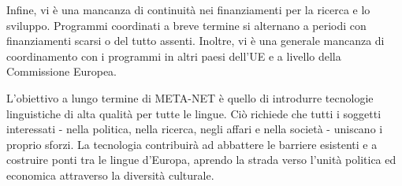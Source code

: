 \documentclass[]{../../metanetpaper}
\begin{document}
\begin{multicols}{2}
Infine, vi \`{e} una mancanza di continuit\`{a} nei finanziamenti per la
ricerca e lo sviluppo. Programmi coordinati a breve termine si alternano a
periodi con finanziamenti scarsi o del tutto assenti. Inoltre, vi \`{e} una
generale mancanza di coordinamento con i programmi in altri paesi dell'UE e a
livello della Commissione Europea.

L'obiettivo a lungo termine di META-NET \`{e} quello di introdurre tecnologie
linguistiche di alta qualit\`{a} per tutte le lingue. Ci\`{o} richiede
che tutti i soggetti interessati - nella politica, nella ricerca, negli affari
e nella societ\`{a} - uniscano i proprio sforzi. La tecnologia contribuir\`{a}
ad abbattere le barriere esistenti e a costruire ponti tra le lingue d'Europa,
aprendo la strada verso l'unit\`{a} politica ed economica attraverso la
diversit\`{a} culturale. 
\end{multicols}

\cleardoublepage


\end{document}
